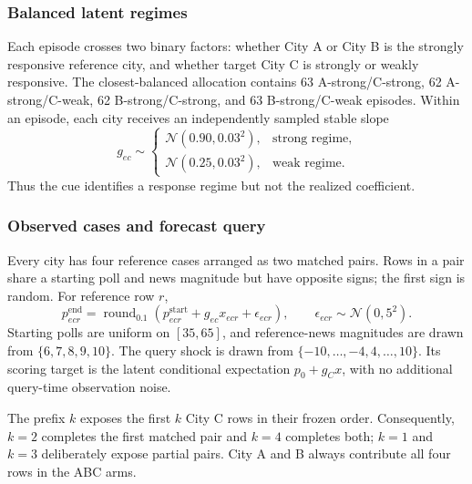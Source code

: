 \subsubsection{Balanced latent regimes}
Each episode crosses two binary factors: whether City A or City B is the strongly
responsive reference city, and whether target City C is strongly or weakly
responsive. The closest-balanced allocation contains 63 A-strong/C-strong,
62 A-strong/C-weak, 62 B-strong/C-strong, and 63 B-strong/C-weak episodes.
Within an episode, each city receives an independently sampled stable slope
\[
  g_{ec}\sim
  \begin{cases}
    \mathcal N(0.90,0.03^2), & \text{strong regime},\\
    \mathcal N(0.25,0.03^2), & \text{weak regime}.
  \end{cases}
\]
Thus the cue identifies a response regime but not the realized coefficient.

\subsubsection{Observed cases and forecast query}
Every city has four reference cases arranged as two matched pairs. Rows in a pair
share a starting poll and news magnitude but have opposite signs; the first sign is
random. For reference row \(r\),
\[
  p^{\mathrm{end}}_{ecr}
    = \operatorname{round}_{0.1}
      \left(p^{\mathrm{start}}_{ecr}+g_{ec}x_{ecr}
      +\epsilon_{ecr}\right),
  \qquad \epsilon_{ecr}\sim\mathcal N(0,5^2).
\]
Starting polls are uniform on \([35,65]\), and reference-news magnitudes are drawn
from \(\{6,7,8,9,10\}\). The query shock is drawn from
\(\{-10,\ldots,-4,4,\ldots,10\}\). Its scoring target is the latent conditional
expectation \(p_0+g_Cx\), with no additional query-time observation noise.

The prefix \(k\) exposes the first \(k\) City C rows in their frozen order.
Consequently, \(k=2\) completes the first matched pair and \(k=4\) completes both;
\(k=1\) and \(k=3\) deliberately expose partial pairs. City A and B always
contribute all four rows in the ABC arms.

